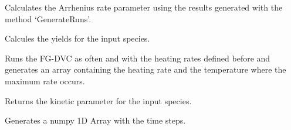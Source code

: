 \documentclass[letterpaper,10pt,english]{sphinxmanual}
\begin{document}
\begin{fulllineitems}
\begin{fulllineitems}
\end{fulllineitems}


\begin{fulllineitems}
\label{Appendix:FGDVC_Fit_lin_regr.Process.calcAE}
Calculates the Arrhenius rate parameter using the results generated with the method `GenerateRuns'.

\end{fulllineitems}


\begin{fulllineitems}
\label{Appendix:FGDVC_Fit_lin_regr.Process.calcYield}
Calcules the yields for the input species.

\end{fulllineitems}


\begin{fulllineitems}
\label{Appendix:FGDVC_Fit_lin_regr.Process.generateRuns}
Runs the FG-DVC as often and with the heating rates defined before and generates an array containing the heating rate and the temperature where the maximum rate occurs.

\end{fulllineitems}


\begin{fulllineitems}
\label{Appendix:FGDVC_Fit_lin_regr.Process.getAE}
Returns the kinetic parameter for the input species.

\end{fulllineitems}


\begin{fulllineitems}
\label{Appendix:FGDVC_Fit_lin_regr.Process.makeDt}
Generates a numpy 1D Array with the time steps.


\end{fulllineitems}
\end{fulllineitems}
\end{document}
